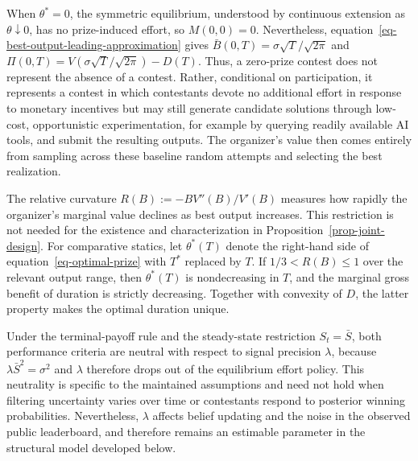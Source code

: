 \documentclass[mnsc]{informs3}
\begin{document}
\begin{remark}\label{rem-zero-prize}
When $\theta^*=0$, the symmetric equilibrium, understood by continuous extension as $\theta\downarrow0$, has no prize-induced effort, so $M(0,0)=0$.
Nevertheless, equation~\eqref{eq-best-output-leading-approximation} gives $\bar B(0,T)=\sigma\sqrt T/\sqrt{2\pi}$ and $\Pi(0,T)=V(\sigma\sqrt T/\sqrt{2\pi})-D(T)$.
Thus, a zero-prize contest does not represent the absence of a contest.
Rather, conditional on participation, it represents a contest in which contestants devote no additional effort in response to monetary incentives but may still generate candidate solutions through low-cost, opportunistic experimentation, for example by querying readily available AI tools, and submit the resulting outputs.
The organizer's value then comes entirely from sampling across these baseline random attempts and selecting the best realization.
\end{remark}

\begin{remark}\label{rem-comparative-statics}
The relative curvature $R(B):=-BV''(B)/V'(B)$ measures how rapidly the organizer's marginal value declines as best output increases.
This restriction is not needed for the existence and characterization in Proposition~\ref{prop-joint-design}.
For comparative statics, let $\theta^*(T)$ denote the right-hand side of equation~\eqref{eq-optimal-prize} with $T^*$ replaced by $T$.
If $1/3<R(B)\leq1$ over the relevant output range, then $\theta^*(T)$ is nondecreasing in $T$, and the marginal gross benefit of duration is strictly decreasing.
Together with convexity of $D$, the latter property makes the optimal duration unique.
\end{remark}

Under the terminal-payoff rule and the steady-state restriction $S_t=\bar S$, both performance criteria are neutral with respect to signal precision $\lambda$, because $\lambda\bar S^2=\sigma^2$ and $\lambda$ therefore drops out of the equilibrium effort policy.
This neutrality is specific to the maintained assumptions and need not hold when filtering uncertainty varies over time or contestants respond to posterior winning probabilities.
Nevertheless, $\lambda$ affects belief updating and the noise in the observed public leaderboard, and therefore remains an estimable parameter in the structural model developed below.
\end{document}
